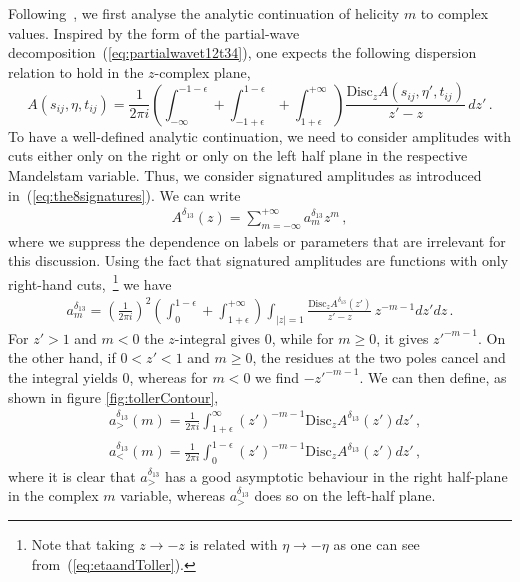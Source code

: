 Following~\cite{Goddard:1971fq}, we first analyse the analytic continuation of helicity $m$ to complex values.
Inspired by the form of the partial-wave decomposition~(\ref{eq:partialwavet12t34}), one expects the following dispersion relation to hold in the
$z$-complex plane, 
\begin{equation}
  A(s_{ij},\eta, t_{ij})=\frac{1}{2\pi i} \left(\int_{-\infty}^{-1-\epsilon}+\int_{-1+\epsilon}^{1-\epsilon}+\int_{1+\epsilon}^{+\infty}\right)\frac{\text{Disc}_{z}A(s_{ij},\eta', t_{ij})}{z'-z}\,dz'\,.
\end{equation}
To have a well-defined analytic continuation, we need to consider amplitudes with cuts either only on the right or only on the left half plane in the respective Mandelstam variable.
Thus, we consider signatured amplitudes as introduced in~(\ref{eq:the8signatures}).
We can write
\begin{align}
  A^{\delta_{13}}(z)=\sum_{m=-\infty}^{+\infty} a_m^{\delta_{13}} z^{m}\,,
\end{align}
where we suppress the dependence on labels or parameters that are irrelevant for this discussion.
Using the fact that signatured amplitudes are functions with only right-hand cuts,~\footnote{Note that taking $z\to-z$ is related with $\eta\to -\eta$ as one can see from~(\ref{eq:etaandToller}).} we have
\begin{align}
  a_m^{\delta_{13}}=\left(\frac{1}{2\pi i}\right)^2 \left(\int_{0}^{1-\epsilon}+\int_{1+\epsilon}^{+\infty}\right)\int_{|z|=1}\frac{\text{Disc}_{z}A^{\delta_{13}}(z')}{z'-z} \, z^{-m-1}dz' dz\,.
\end{align}
For $z'>1$ and $m<0$ the $z$-integral gives 0, while for $m\ge0$, it gives $z'^{-m-1}$. On the other hand, if $0<z'<1$ and $m\ge 0$, the residues at the two poles cancel and the integral yields $ 0 $, whereas for $m<0$ we find $-z'^{-m-1}$.
We can then define, as shown in figure \ref{fig:tollerContour},
\begin{align}
  \label{eq:aForsignaturedHelicity}
   & a_{>}^{\delta_{13}}(m)=\frac{1}{2\pi i} \int_{1+\epsilon}^{\infty}(z')^{-m-1}\text{Disc}_{z}A^{\delta_{13}}(z') dz'\,, \\
   & a_{<}^{\delta_{13}}(m)=\frac{1}{2\pi i} \int_{0}^{1-\epsilon}(z')^{-m-1}\text{Disc}_{z}A^{\delta_{13}}(z')dz'\,,
\end{align}
where it is clear that $a_{>}^{\delta_{13}}$ has a good asymptotic behaviour in the right half-plane in the complex $m$ variable, whereas $a_{>}^{\delta_{13}}$ does so on the left-half plane.
